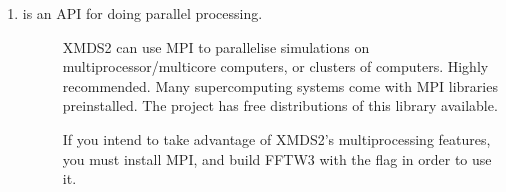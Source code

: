 \documentclass[letterpaper,10pt,english]{sphinxmanual}
\begin{document}
\begin{enumerate}
\begin{description}
\begin{enumerate}
\begin{description}
\sphinxAtStartPar
If you want to be able to use the single precision option within XMDS2, you must additionally build the single precision FFTW libraries via:

\begin{sphinxVerbatim}[commandchars=\\\{\}]
./configure \PYGZhy{}\PYGZhy{}disable\PYGZhy{}fortran \PYGZhy{}\PYGZhy{}enable\PYGZhy{}mpi \PYGZhy{}\PYGZhy{}enable\PYGZhy{}single \PYGZhy{}\PYGZhy{}enable\PYGZhy{}sse2 \PYGZhy{}\PYGZhy{}enable\PYGZhy{}openmp \PYGZhy{}\PYGZhy{}enable\PYGZhy{}avx \PYGZhy{}\PYGZhy{}enable\PYGZhy{}avx2 \PYGZhy{}\PYGZhy{}enable\PYGZhy{}threads
make
sudo make install
\end{sphinxVerbatim}

\sphinxAtStartPar
Note that compiling OpenMP directives is difficult with a Mac as the Clang compiler doesn’t support OpenMP at this time (although MPI works fine), so you’ll probably want to omit the  flag. If you’re on a Mac and really want OpenMP functionality in XMDS2 (unlikely, as for most XMDS2 use cases MPI is faster), build FFTW with gcc, then tell XMDS2 to use gcc over clang in general use.

\end{description}

\item {} \begin{description}
\item[{ is an API for doing parallel processing.}] \leavevmode
\sphinxAtStartPar
XMDS2 can use MPI to parallelise simulations on multi\sphinxhyphen{}processor/multi\sphinxhyphen{}core computers, or clusters of computers. Highly recommended.
Many supercomputing systems come with MPI libraries pre\sphinxhyphen{}installed.
The  project has free distributions of this library available.

\sphinxAtStartPar
If you intend to take advantage of XMDS2’s multi\sphinxhyphen{}processing features, you must install MPI, and build FFTW3 with the  flag in order to use it.

\end{description}

\end{enumerate}

\end{description}


\end{enumerate}
\end{document}
